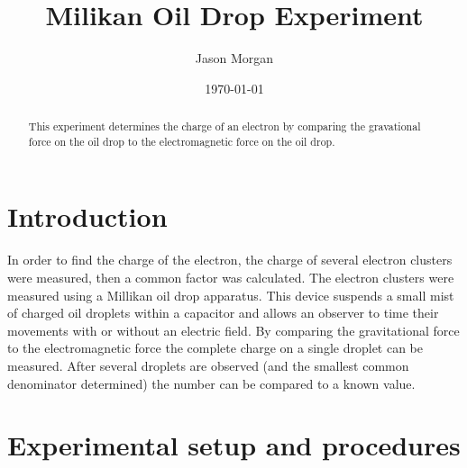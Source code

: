 \documentclass[twocolumn,secnumarabic,amssymb, nobibnotes, aps, pra]{revtex4}
\begin{document}
\title{Milikan Oil Drop Experiment
 }


\author{Jason Morgan}



\date{\today}


\begin{abstract}
This experiment determines the charge of an electron by comparing the gravational force on the oil drop to the electromagnetic force on the oil drop.
\end{abstract}

\maketitle
\section{Introduction}

In order to find the charge of the electron, the charge of several electron clusters were measured, then a common factor was calculated. The electron clusters were measured using a Millikan oil drop apparatus. This device suspends a small mist of charged oil droplets within a capacitor and allows an observer to time their movements with or without an electric field. By comparing the gravitational force to the electromagnetic force the complete charge on a single droplet can be measured. After several droplets are observed (and the smallest common denominator determined) the number can be compared to a known value. 

\section{Experimental setup and procedures}
\end{document}
